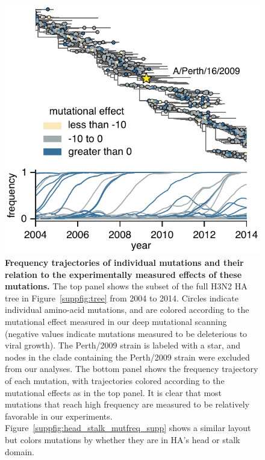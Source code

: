 \documentclass[9pt,twocolumn,twoside]{pnas-new}
\begin{document}
\begin{figure}[t!]
\centering
\includegraphics[width=0.95\linewidth]{figs/frequency_trajectory_ex/frequency_trajectory_ex.pdf}
\caption{\label{fig:frequency_trajectory}
{\bf Frequency trajectories of individual mutations and their relation to the experimentally measured effects of these mutations.}
The top panel shows the subset of the full H3N2 HA tree in Figure~\ref{suppfig:tree} from 2004 to 2014.
Circles indicate individual amino-acid mutations, and are colored according to the mutational effect measured in our deep mutational scanning (negative values indicate mutations measured to be deleterious to viral growth).
The Perth/2009 strain is labeled with a star, and nodes in the clade containing the Perth/2009 strain were excluded from our analyses.
The bottom panel shows the frequency trajectory of each mutation, with trajectories colored according to the mutational effects as in the top panel.
It is clear that most mutations that reach high frequency are measured to be relatively favorable in our experiments.
Figure~\ref{suppfig:head_stalk_mutfreq_supp} shows a similar layout but colors mutations by whether they are in HA's head or stalk domain.
}
\end{figure}
\end{document}
